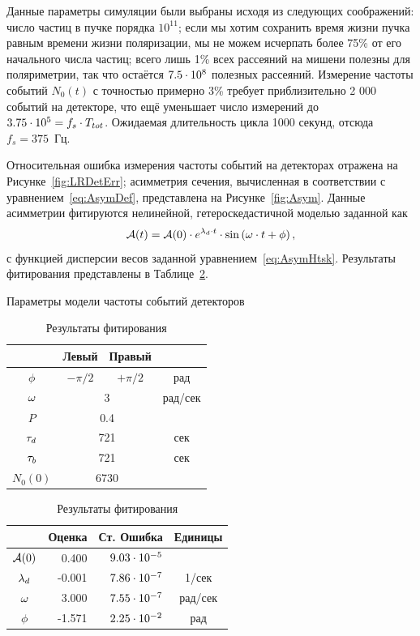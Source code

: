Данные параметры симуляции были выбраны исходя из следующих
соображений: число частиц в пучке порядка $10^{11}$; если мы хотим
сохранить время жизни пучка равным времени жизни поляризации, мы не
можем исчерпать более 75\% от его начального числа частиц; всего лишь
1\% всех рассеяний на мишени полезны для поляриметрии, так что
остаётся ${7.5}\cdot 10^{8}$ полезных рассеяний. Измерение частоты событий
$N_0(t)$ с точностью примерно 3\% требует приблизительно 2 000 событий
на детекторе, что ещё уменьшает число измерений до ${{3.75}\cdot 10^{5}=f_s\cdot T_{tot}}$. 
Ожидаемая длительность цикла 1000 секунд, отсюда $f_s = 375$~Гц. 

Относительная ошибка измерения частоты событий на детекторах отражена на
Рисунке~\ref{fig:LRDetErr}; асимметрия сечения, вычисленная в
соответствии с уравнением~\eqref{eq:AsymDef}, представлена на Рисунке~\ref{fig:Asym}.
Данные асимметрии фитируются нелинейной, гетероскедастичной моделью
заданной как
\[
\Asym(t) = \Asym(0)\cdot e^{\lamd\cdot t}\cdot\sin\bkt{\w\cdot t + \phi},
\]
с функцией дисперсии весов заданной
уравнением~\eqref{eq:AsymHtsk}. Результаты фитирования представлены в Таблице~\ref{tbl:FitRes}.
\begin{table}[h]
	\begin{minipage}[t]{.5\linewidth}
		\centering
		\caption{Параметры модели частоты событий детекторов\label{tbl:DetCntRtParam}}
		\begin{tabular}[t]{cccc}
			\toprule
			         & Левый    & Правый        &         \\ \midrule
			$\phi$   & $-\pi/2$ & $+\pi/2$      & рад     \\
			$\omega$     &  \multicolumn{2}{c}{3}   & рад/сек \\
			$P$      & \multicolumn{2}{c}{0.4}  &         \\
			$\tau_d$   & \multicolumn{2}{c}{721}  & сек     \\
			$\tau_b$   & \multicolumn{2}{c}{721}  & сек     \\
			$N_0(0)$ & \multicolumn{2}{c}{6730} &         \\ \bottomrule
		\end{tabular}
	\end{minipage}%
	\begin{minipage}[t]{.5\linewidth}
		\centering
		\caption{Результаты фитирования\label{tbl:FitRes}}
		\begin{tabular}[t]{crrc}
			\toprule
			           & Оценка & Ст. Ошибка      & Единицы \\ \midrule
			$\mathcal{A}(0)$ & 0.400  & ${9.03}\cdot 10^{-5}$ &         \\
			$\lambda_d$    & -0.001 & ${7.86}\cdot 10^{-7}$ & 1/сек   \\
			$\omega$       & 3.000  & ${7.55}\cdot 10^{-7}$ & рад/сек \\
			$\phi$     & -1.571 & ${2.25}\cdot 10^{-2}$ & рад     \\ \bottomrule
		\end{tabular}
	\end{minipage}
\end{table}

